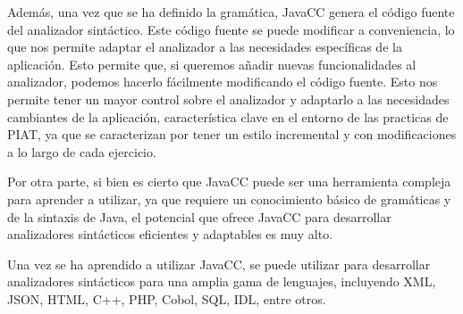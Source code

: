 Además, una vez que se ha definido la gramática, JavaCC genera el código fuente del analizador sintáctico. Este código fuente se puede modificar a conveniencia, lo que nos permite adaptar el analizador a las necesidades específicas de la aplicación. Esto permite que, si queremos añadir nuevas funcionalidades al analizador, podemos hacerlo fácilmente modificando el código fuente. Esto nos permite tener un mayor control sobre el analizador y adaptarlo a las necesidades cambiantes de la aplicación, característica clave en el entorno de las practicas de PIAT, ya que se caracterizan por tener un estilo incremental y con modificaciones a lo largo de cada ejercicio.

Por otra parte, si bien es cierto que JavaCC puede ser una herramienta compleja para aprender a utilizar, ya que requiere un conocimiento básico de gramáticas y de la sintaxis de Java, el potencial que ofrece JavaCC para desarrollar analizadores sintácticos eficientes y adaptables es muy alto.

Una vez se ha aprendido a utilizar JavaCC, se puede utilizar para desarrollar analizadores sintácticos para una amplia gama de lenguajes, incluyendo XML, JSON, HTML, C++, PHP, Cobol, SQL, IDL, entre otros\cite{javaccgithub}.